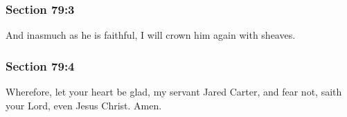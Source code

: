 	\subsubsection{Section 79:3} %
		\label{DC79-3}

		And inasmuch as he is faithful, I will crown him again with sheaves.


	\subsubsection{Section 79:4} %
		\label{DC79-4}

		Wherefore, let your heart be glad, my servant Jared Carter, and fear not, saith your Lord, even Jesus Christ.  Amen.

